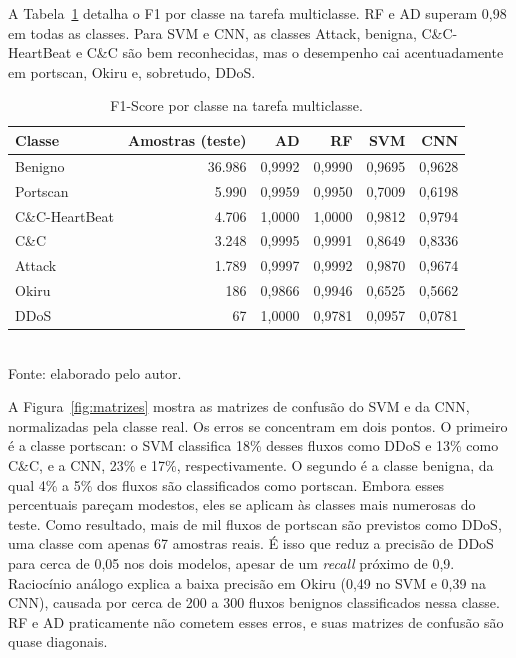 A Tabela~\ref{tab:f1-por-classe} detalha o F1 por classe na tarefa multiclasse. RF e AD superam 0,98 em todas as classes. Para SVM e CNN, as classes Attack, benigna, C\&C-HeartBeat e C\&C são bem reconhecidas, mas o desempenho cai acentuadamente em portscan, Okiru e, sobretudo, DDoS.

\begin{table}[htbp]
\centering
\caption{F1-Score por classe na tarefa multiclasse.}
\label{tab:f1-por-classe}
\begin{tabular}{lrrrrr}
\toprule
\textbf{Classe} & \textbf{Amostras (teste)} & \textbf{AD} & \textbf{RF} & \textbf{SVM} & \textbf{CNN} \\
\midrule
Benigno        & 36.986 & 0,9992 & 0,9990 & 0,9695 & 0,9628 \\
Portscan       &  5.990 & 0,9959 & 0,9950 & 0,7009 & 0,6198 \\
C\&C-HeartBeat &  4.706 & 1,0000 & 1,0000 & 0,9812 & 0,9794 \\
C\&C           &  3.248 & 0,9995 & 0,9991 & 0,8649 & 0,8336 \\
Attack         &  1.789 & 0,9997 & 0,9992 & 0,9870 & 0,9674 \\
Okiru          &    186 & 0,9866 & 0,9946 & 0,6525 & 0,5662 \\
DDoS           &     67 & 1,0000 & 0,9781 & 0,0957 & 0,0781 \\
\bottomrule
\end{tabular}
\\[2pt]
\small{Fonte: elaborado pelo autor.}
\end{table}

A Figura~\ref{fig:matrizes} mostra as matrizes de confusão do SVM e da CNN, normalizadas pela classe real. Os erros se concentram em dois pontos. O primeiro é a classe portscan: o SVM classifica 18\% desses fluxos como DDoS e 13\% como C\&C, e a CNN, 23\% e 17\%, respectivamente. O segundo é a classe benigna, da qual 4\% a 5\% dos fluxos são classificados como portscan. Embora esses percentuais pareçam modestos, eles se aplicam às classes mais numerosas do teste. Como resultado, mais de mil fluxos de portscan são previstos como DDoS, uma classe com apenas 67 amostras reais. É isso que reduz a precisão de DDoS para cerca de 0,05 nos dois modelos, apesar de um \textit{recall} próximo de 0,9. Raciocínio análogo explica a baixa precisão em Okiru (0,49 no SVM e 0,39 na CNN), causada por cerca de 200 a 300 fluxos benignos classificados nessa classe. RF e AD praticamente não cometem esses erros, e suas matrizes de confusão são quase diagonais.

